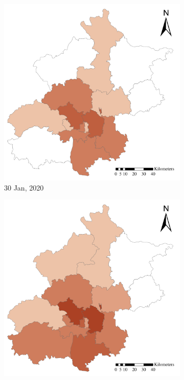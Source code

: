 \documentclass[ijgi,submit,moreauthors,pdftex]{Definitions/mdpi}
\begin{document}
\begin{figure}[ht]
\begin{subfigure}{.23\textwidth}
		\includegraphics[width=\textwidth]{Figures/ConfirmedDistrictD2020_01_30-eps-converted-to.pdf}
        \caption{30 Jan, 2020}
    \end{subfigure}
    \begin{subfigure}{.23\textwidth}
    	\includegraphics[width=\textwidth]{Figures/ConfirmedDistrictD2020_02_05-eps-converted-to.pdf}

\end{subfigure}
\end{figure}
\end{document}

